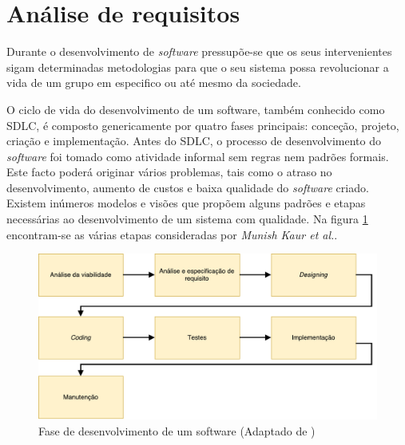 





\section{Análise de requisitos}
\label{sect:analise}

Durante o desenvolvimento de \textit{software} pressupõe-se que os seus intervenientes sigam determinadas metodologias para que o seu sistema possa revolucionar a vida de um grupo em especifico ou até mesmo da sociedade. 


O ciclo de vida do desenvolvimento de um software, também conhecido como \ac{SDLC}, é composto genericamente por quatro fases principais: conceção, projeto, criação e implementação. Antes do \ac{SDLC}, o processo de desenvolvimento do \textit{software} foi tomado como atividade informal sem regras nem padrões formais. Este facto poderá originar vários problemas, tais como o atraso no desenvolvimento, aumento de custos e baixa qualidade do \textit{software} criado. Existem inúmeros modelos e visões que propõem alguns padrões e etapas necessárias ao desenvolvimento de um sistema com qualidade.
Na figura \ref{sdlcartic} encontram-se as várias etapas consideradas por \textit{Munish Kaur et al.}\cite{Saini2014}.



\newpage

\begin{figure}[!htb]
	\centering
	\includegraphics[scale=0.6]{esquemas/desenvolvimentoSW.pdf}
	\caption[Fase de desenvolvimento de um software ]{Fase de desenvolvimento de um software (Adaptado de \cite{Saini2014})}
	\label{sdlcartic}
\end{figure}




